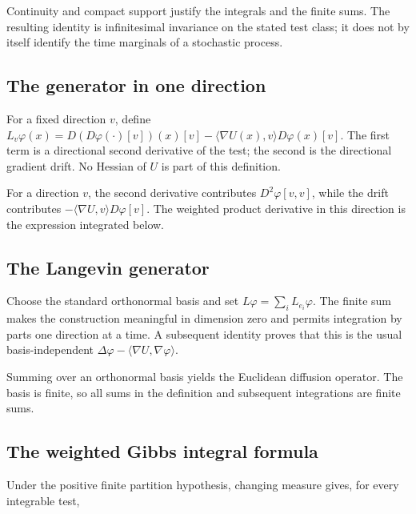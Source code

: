 \documentclass[11pt,a4paper]{report}
\begin{document}
Continuity and compact support justify the integrals and the finite sums. The resulting identity is infinitesimal invariance on the stated test class; it does not by itself identify the time marginals of a stochastic process.

\subsection{\texorpdfstring{The generator in one direction}{The generator in one direction}}
\label{report-step-UnadjustedLangevin-Generator-lean-1}


For a fixed direction \(v\), define \(L_v\varphi(x)=D(D\varphi(\cdot)[v])(x)[v]-\langle\nabla U(x),v\rangle D\varphi(x)[v]\). The first term is a directional second derivative of the test; the second is the directional gradient drift. No Hessian of \(U\) is part of this definition.



For a direction \(v\), the second derivative contributes \(D^2\varphi[v,v]\), while the drift contributes \(-\langle\nabla U,v\rangle D\varphi[v]\). The weighted product derivative in this direction is the expression integrated below.

\subsection{\texorpdfstring{The Langevin generator}{The Langevin generator}}
\label{report-step-UnadjustedLangevin-Generator-lean-2}


Choose the standard orthonormal basis and set \(L\varphi=\sum_iL_{e_i}\varphi\). The finite sum makes the construction meaningful in dimension zero and permits integration by parts one direction at a time. A subsequent identity proves that this is the usual basis-independent \(\Delta\varphi-\langle\nabla U,\nabla\varphi\rangle\).



Summing over an orthonormal basis yields the Euclidean diffusion operator. The basis is finite, so all sums in the definition and subsequent integrations are finite sums.

\subsection{\texorpdfstring{The weighted Gibbs integral formula}{The weighted Gibbs integral formula}}
\label{report-step-UnadjustedLangevin-Generator-lean-3}


Under the positive finite partition hypothesis, changing measure gives, for every integrable test,
\end{document}
